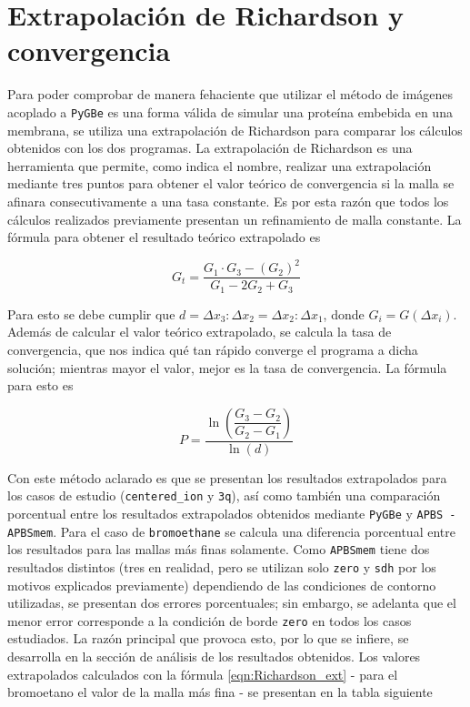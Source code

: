 \documentclass[12pt, oneside, numbers, spanish]{ezthesis}
\numberwithin{equation}{section}
\begin{document}
\section{Extrapolación de Richardson y convergencia}
Para poder comprobar de manera fehaciente que utilizar el método de imágenes acoplado a \texttt{PyGBe} es una forma válida de simular una proteína embebida en una membrana, se utiliza una extrapolación de Richardson para comparar los cálculos obtenidos con los dos programas. La extrapolación de Richardson es una herramienta que permite, como indica el nombre, realizar una extrapolación mediante tres puntos para obtener el valor teórico de convergencia si la malla se afinara consecutivamente a una tasa constante. Es por esta razón que todos los cálculos realizados previamente presentan un refinamiento de malla constante. La fórmula para obtener el resultado teórico extrapolado es

\begin{equation}\label{eqn:Richardson_ext}
G_t = \frac{G_1\cdot G_3 - (G_2)^2}{G_1 - 2G_2 + G_3}
\end{equation}

\noindent
Para esto se debe cumplir que $d = \Delta x_3:\Delta x_2 = \Delta x_2:\Delta x_1$, donde $G_i = G(\Delta x_i)$. Además de calcular el valor teórico extrapolado, se calcula la tasa de convergencia, que nos indica qué tan rápido converge el programa a dicha solución; mientras mayor el valor, mejor es la tasa de convergencia. La fórmula para esto es

\begin{equation}\label{eqn:convergence_rating}
	P = \dfrac{\ln{\left(\dfrac{G_3 - G_2}{G_2 - G_1}\right)}}{\ln{(d)}}
\end{equation}

\noindent
Con este método aclarado es que se presentan los resultados extrapolados para los casos de estudio (\texttt{centered\_ion} y \texttt{3q}), así como también una comparación porcentual entre los resultados extrapolados obtenidos mediante \texttt{PyGBe} y \texttt{APBS - APBSmem}. Para el caso de \texttt{bromoethane} se calcula una diferencia porcentual entre los resultados para las mallas más finas solamente. Como \texttt{APBSmem} tiene dos resultados distintos (tres en realidad, pero se utilizan solo \texttt{zero} y \texttt{sdh} por los motivos explicados previamente) dependiendo de las condiciones de contorno utilizadas, se presentan dos errores porcentuales; sin embargo, se adelanta que el menor error corresponde a la condición de borde \texttt{zero} en todos los casos estudiados. La razón principal que provoca esto, por lo que se infiere, se desarrolla en la sección de análisis de los resultados obtenidos. Los valores extrapolados calculados con la fórmula \ref{eqn:Richardson_ext} - para el bromoetano el valor de la malla más fina - se presentan en la tabla siguiente
\end{document}
